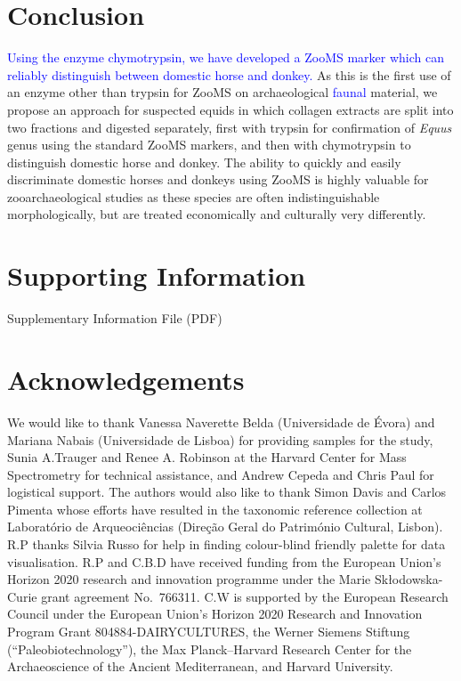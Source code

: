 \documentclass[preprint, 3p, authoryear]{elsarticle} %
\begin{document}
\hypertarget{conclusion}{%
\section{Conclusion}\label{conclusion}}

\textcolor{blue}{Using the enzyme chymotrypsin, we have developed a ZooMS marker which can reliably distinguish between domestic horse and donkey.} As this is the first use of an enzyme other than trypsin for ZooMS on archaeological \textcolor{blue}{faunal} material, we propose an approach for suspected equids in which collagen extracts are split into two fractions and digested separately, first with trypsin for confirmation of \emph{Equus} genus using the standard ZooMS markers, and then with chymotrypsin to distinguish domestic horse and donkey. The ability to quickly and easily discriminate domestic horses and donkeys using ZooMS is highly valuable for zooarchaeological studies as these species are often indistinguishable morphologically, but are treated economically and culturally very differently.

\hypertarget{supporting-information}{%
\section*{Supporting Information}\label{supporting-information}}

Supplementary Information File (PDF)

\hypertarget{acknowledgements}{%
\section*{Acknowledgements}\label{acknowledgements}}

We would like to thank Vanessa Naverette Belda (Universidade de Évora) and Mariana Nabais (Universidade de Lisboa) for providing samples for the study, Sunia A.Trauger and Renee A. Robinson at the Harvard Center for Mass Spectrometry for technical assistance, and Andrew Cepeda and Chris Paul for logistical support. The authors would also like to thank Simon Davis and Carlos Pimenta whose efforts have resulted in the taxonomic reference collection at Laboratório de Arqueociências (Direção Geral do Património Cultural, Lisbon). R.P thanks Silvia Russo for help in finding colour-blind friendly palette for data visualisation. R.P and C.B.D have received funding from the European Union's Horizon 2020 research and innovation programme under the Marie Skłodowska-Curie grant agreement No.~766311. C.W is supported by the European Research Council under the European Union's Horizon 2020 Research and Innovation Program Grant 804884-DAIRYCULTURES, the Werner Siemens Stiftung (``Paleobiotechnology''), the Max Planck--Harvard Research Center for the Archaeoscience of the Ancient Mediterranean, and Harvard University.
\end{document}
